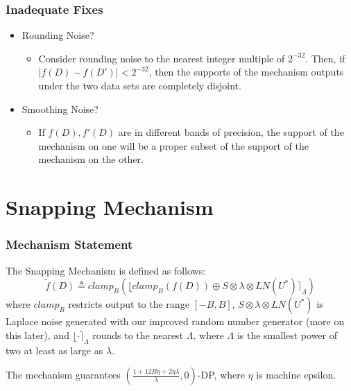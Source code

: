 \documentclass{beamer}
\begin{document}
\begin{frame}
    \frametitle{Inadequate Fixes}
    \begin{itemize}
        \item Rounding Noise?
        \begin{itemize}
            \item Consider rounding noise to the nearest integer multiple of $2^{-32}$. Then, if $\vert f(D) - f(D') \vert < 2^{-32}$, then the supports of the mechanism outputs under the two data sets are completely disjoint.
        \end{itemize}
        \item Smoothing Noise?
        \begin{itemize}
            \item If $f(D), f'(D)$ are in different bands of precision, the support of the mechanism on one will be a proper subset of the support of the mechanism on the other.
        \end{itemize}
    \end{itemize}
\end{frame}

\section{Snapping Mechanism}
\begin{frame}
    \frametitle{Mechanism Statement}
    The Snapping Mechanism \cite{Mir12} is defined as follows:
    \[ \tilde{f}(D) \triangleq clamp_{B} \left( \lfloor clamp_{B}(f(D)) \oplus S \otimes \lambda \otimes LN(U^*) \rceil_{\Lambda} \right) \]
    where $clamp_{B}$ restricts output to the range $[-B, B]$, $S \otimes \lambda \otimes LN(U^*)$ is Laplace noise generated with our improved random number generator (more on this later), and $\lfloor \cdot \rceil_{\Lambda}$ rounds to the nearest $\Lambda$, where $\Lambda$ is the smallest power of two at least as large as $\lambda$.

    The mechanism guarantees $\left(\frac{1 + 12B \eta + 2\eta\lambda}{\lambda}, 0\right)$-DP, where $\eta$ is machine epsilon.

\end{frame}
\end{document}
